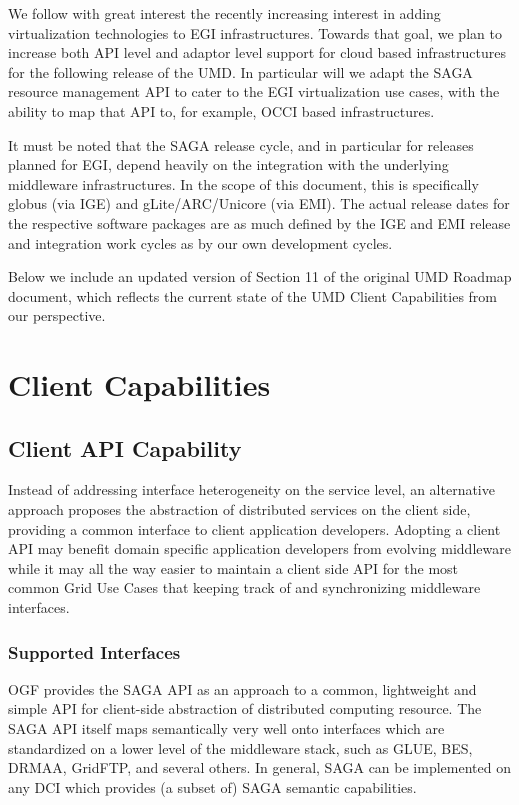 \documentclass[10pt]{article}
\begin{document}
  We follow with great interest the recently increasing interest in
  adding virtualization technologies to EGI infrastructures.  Towards
  that goal, we plan to increase both API level and adaptor level
  support for cloud based infrastructures for the following release of
  the UMD.  In particular will we adapt the SAGA resource management
  API to cater to the EGI virtualization use cases, with the ability
  to map that API to, for example, OCCI based infrastructures.


  It must be noted that the SAGA release cycle, and in particular for
  releases planned for EGI, depend heavily on the integration with
  the underlying middleware infrastructures.  In the scope of this
  document, this is specifically globus (via IGE) and
  gLite/ARC/Unicore (via EMI).  The actual release dates for the
  respective software packages are as much defined by the IGE and EMI
  release and integration work cycles as by our own development cycles.


  Below we include an updated version of Section 11 of the original
  UMD Roadmap document, which reflects the current state of the UMD
  Client Capabilities from our perspective.

 
 \setcounter{section}{10}
 \section{Client Capabilities}

 \subsection{Client API Capability}

  Instead of addressing interface heterogeneity on the service level,
  an alternative approach proposes the abstraction of distributed
  services on the client side, providing a common interface to client
  application developers.  Adopting a client API may benefit domain
  specific application developers from evolving middleware while it
  may all the way easier to maintain a client side API for the most
  common Grid Use Cases that keeping track of and synchronizing
  middleware interfaces.


 \subsubsection{Supported Interfaces}

  OGF provides the SAGA API as an approach to a common, lightweight
  and simple API for client-side abstraction of distributed computing
  resource.  The SAGA API itself maps semantically very well onto
  interfaces which are standardized on a lower level of the middleware
  stack, such as GLUE, BES, DRMAA, GridFTP, and several others.  In
  general, SAGA can be implemented on any DCI which provides (a subset
  of) SAGA semantic capabilities.
\end{document}
